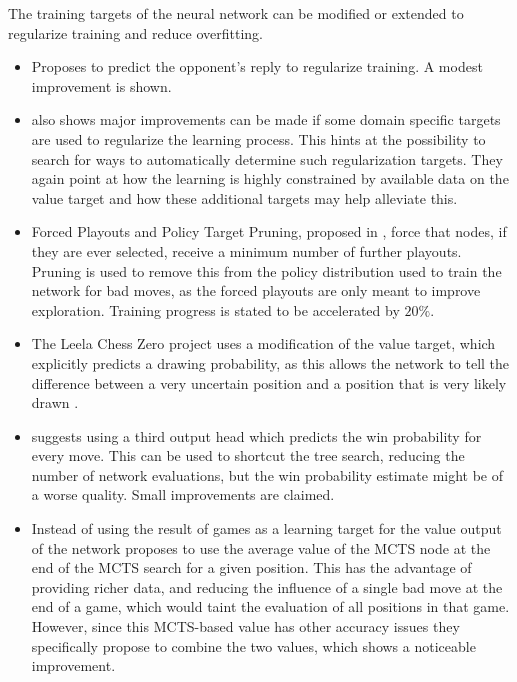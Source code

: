 \documentclass[12pt,onecolumn,oneside,titlepage]{article}
\begin{document}
The training targets of the neural network can be modified or extended to regularize training and reduce overfitting.

\begin{itemize}
 \item \cite{wu2019accelerating} Proposes to predict the opponent's reply to regularize training. A modest improvement is shown.
 \item \cite{wu2019accelerating} also shows major improvements can be made if some domain specific targets are used to regularize the learning process. This hints at the possibility to search for ways to automatically determine such regularization targets.
 They again point at how the learning is highly constrained by available data on the value target and how these additional targets may help alleviate this.
 \item Forced Playouts and Policy Target Pruning, proposed in \cite{wu2019accelerating}, force that nodes, if they are ever selected, receive a minimum number of further playouts. Pruning is used to remove this from the policy distribution used to train the network for bad moves,
 as the forced playouts are only meant to improve exploration. Training progress is stated to be accelerated by $20\%$.
 \item The Leela Chess Zero project uses a modification of the value target, which explicitly predicts a drawing probability, as this allows the network to tell the difference between a very uncertain position and a position that is very likely drawn \cite{leela0wdl}.
 \item \cite{anonymous2020threehead} suggests using a third output head which predicts the win probability for every move. This can be used to shortcut the tree search, reducing the number of network evaluations, but the win probability estimate might be of a worse quality.
  Small improvements are claimed.
 \item Instead of using the result of games as a learning target for the value output of the network \cite{oracledevs6} proposes to use the average value of the MCTS node at the end of the MCTS search for a given position. This has the advantage of providing richer data,
 and reducing the influence of a single bad move at the end of a game, which would taint the evaluation of all positions in that game. However, since this MCTS-based value has other accuracy issues they specifically propose to combine the two values, which shows a noticeable improvement.
\end{itemize}
\end{document}
